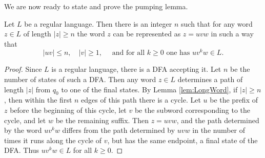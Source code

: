 \begin{page}
\setcounter{section}{3}
\setcounter{subsection}{2}
\setcounter{dfn}{3}
\label{portion:1122}


We are now ready to state and prove the pumping lemma.


\end{page}

\begin{page}
\setcounter{section}{3}
\setcounter{subsection}{2}
\setcounter{dfn}{4}
\label{portion:1124}

\begin{thm}
Let $L$ be a regular language.
Then there is an integer $n$ such that for any word $z \in L$ of length $|z| \ge n$ the word $z$ can be represented as $z = uvw$ in such a way that
\[
|uv| \le n, \quad |v| \ge 1, \quad \text{ and for all }k \ge 0 \text{ one has } uv^kw \in L.
\]
\end{thm}

\end{page}

\begin{page}
\setcounter{section}{3}
\setcounter{subsection}{2}
\setcounter{dfn}{4}
\label{portion:1125}

\begin{proof}
Since $L$ is a regular language, there is a DFA accepting it.
Let $n$ be the number of states of such a DFA.
Then any word $z \in L$ determines a path of length $|z|$ from $q_0$ to one of the final states.
By Lemma \ref{lem:LongWord}, if $|z| \ge n$, then within the first $n$ edges of this path there is a cycle.
Let $u$ be the prefix of $z$ before the beginning of this cycle, let $v$ be the subword corresponding to the cycle, and let $w$ be the remaining suffix.
Then $z = uvw$, and the path determined by the word $uv^kw$ differs from the path determined by $uvw$ in the number of times it runs along the cycle of $v$,
but has the same endpoint, a final state of the DFA.
Thus $uv^kw \in L$ for all $k \ge 0$.
\end{proof}


\end{page}

